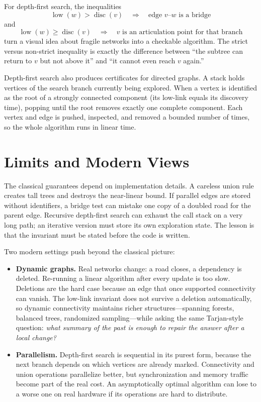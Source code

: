 For depth-first search, the inequalities
\[
\operatorname{low}(w)>\operatorname{disc}(v)\quad\Longrightarrow\quad \text{edge }v\text{--}w\text{ is a bridge}
\]
and
\[
\operatorname{low}(w)\geq\operatorname{disc}(v)\quad\Longrightarrow\quad v\text{ is an articulation point for that branch}
\]
turn a visual idea about fragile networks into a checkable algorithm. The strict versus non-strict inequality is exactly the difference between ``the subtree can return to $v$ but not above it'' and ``it cannot even reach $v$ again.''

Depth-first search also produces certificates for directed graphs. A stack holds vertices of the search branch currently being explored. When a vertex is identified as the root of a strongly connected component (its low-link equals its discovery time), popping until the root removes exactly one complete component. Each vertex and edge is pushed, inspected, and removed a bounded number of times, so the whole algorithm runs in linear time.

\section{Limits and Modern Views}
The classical guarantees depend on implementation details. A careless union rule creates tall trees and destroys the near-linear bound. If parallel edges are stored without identifiers, a bridge test can mistake one copy of a doubled road for the parent edge. Recursive depth-first search can exhaust the call stack on a very long path; an iterative version must store its own exploration state. The lesson is that the invariant must be stated before the code is written.

Two modern settings push beyond the classical picture:
\begin{itemize}
\item \textbf{Dynamic graphs.} Real networks change: a road closes, a dependency is deleted. Re-running a linear algorithm after every update is too slow. Deletions are the hard case because an edge that once supported connectivity can vanish. The low-link invariant does not survive a deletion automatically, so dynamic connectivity maintains richer structures---spanning forests, balanced trees, randomized sampling---while asking the same Tarjan-style question: \emph{what summary of the past is enough to repair the answer after a local change?}
\item \textbf{Parallelism.} Depth-first search is sequential in its purest form, because the next branch depends on which vertices are already marked. Connectivity and union operations parallelize better, but synchronization and memory traffic become part of the real cost. An asymptotically optimal algorithm can lose to a worse one on real hardware if its operations are hard to distribute.
\end{itemize}

